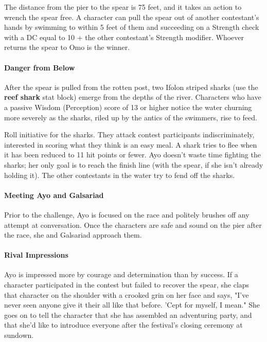\documentclass[a4paper, 11pt, bg=full, twocolumn, nooutline]{dndbook}
\begin{document}
The distance from the pier to the spear is 75 feet, and it takes an action to wrench the spear free. A character can pull the spear out of another contestant's hands by swimming to within 5 feet of them and succeeding on a Strength check with a DC equal to 10 + the other contestant's Strength modifier. Whoever returns the spear to Omo is the winner.

\paragraph{Danger from Below}

After the spear is pulled from the rotten post, two Ifolon striped sharks (use the \textbf{reef shark} stat block) emerge from the depths of the river. Characters who have a passive Wisdom (Perception) score of 13 or higher notice the water churning more severely as the sharks, riled up by the antics of the swimmers, rise to feed.

Roll initiative for the sharks. They attack contest participants indiscriminately, interested in scoring what they think is an easy meal. A shark tries to flee when it has been reduced to 11 hit points or fewer. Ayo doesn't waste time fighting the sharks; her only goal is to reach the finish line (with the spear, if she isn't already holding it). The other contestants in the water try to fend off the sharks.

\paragraph{Meeting Ayo and Galsariad}

Prior to the challenge, Ayo is focused on the race and politely brushes off any attempt at conversation. Once the characters are safe and sound on the pier after the race, she and Galsariad approach them.

\paragraph{Rival Impressions}

Ayo is impressed more by courage and determination than by success. If a character participated in the contest but failed to recover the spear, she claps that character on the shoulder with a crooked grin on her face and says, "I've never seen anyone give it their all like that before. 'Cept for myself, I mean." She goes on to tell the character that she has assembled an adventuring party, and that she'd like to introduce everyone after the festival's closing ceremony at sundown.
\end{document}
